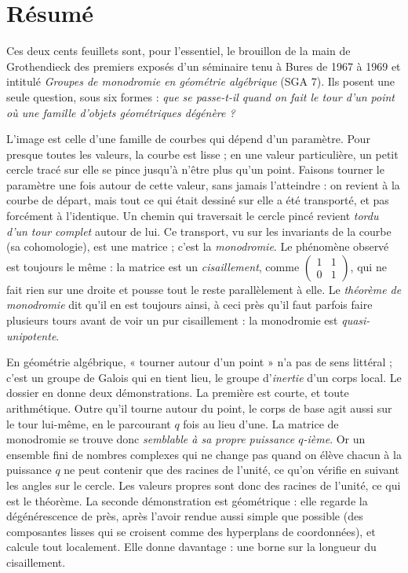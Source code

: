 \documentclass[11pt,a4paper]{article}
\begin{document}
\section*{Résumé}

\begin{resume}
Ces deux cents feuillets sont, pour l'essentiel, le brouillon de la main de
Grothendieck des
premiers exposés d'un séminaire tenu à Bures de 1967 à 1969 et intitulé
\emph{Groupes de monodromie en géométrie algébrique} (SGA 7). Ils posent une
seule question, sous six formes : \emph{que se passe-t-il quand on fait le tour
d'un point où une famille d'objets géométriques dégénère ?}

L'image est celle d'une famille de courbes qui dépend d'un paramètre. Pour
presque toutes les valeurs, la courbe est lisse ; en une valeur particulière,
un petit cercle tracé sur elle se pince jusqu'à n'être plus qu'un point. Faisons
tourner le paramètre une fois autour de cette valeur, sans jamais l'atteindre :
on revient à la courbe de départ, mais tout ce qui était dessiné sur elle a été
transporté, et pas forcément à l'identique. Un chemin qui traversait le cercle
pincé revient \emph{tordu d'un tour complet} autour de lui. Ce transport, vu sur
les invariants de la courbe (sa cohomologie), est une matrice ; c'est la
\emph{monodromie}. Le phénomène observé est toujours le même : la matrice est
un \emph{cisaillement}, comme
$\left(\begin{smallmatrix} 1 & 1 \\ 0 & 1 \end{smallmatrix}\right)$, qui ne fait
rien sur une droite et pousse tout le reste parallèlement à elle. Le
\emph{théorème de monodromie} dit qu'il en est toujours ainsi, à ceci près qu'il
faut parfois faire plusieurs tours avant de voir un pur cisaillement : la
monodromie est \emph{quasi-unipotente}.

En géométrie algébrique, « tourner autour d'un point » n'a pas de sens
littéral ; c'est un groupe de Galois qui en tient lieu, le groupe d'\emph{inertie}
d'un corps local. Le dossier en donne deux démonstrations. La première est
courte, et toute arithmétique. Outre qu'il tourne autour du point, le corps de
base agit aussi sur le tour lui-même,
en le parcourant $q$ fois au lieu d'une. La matrice de monodromie se trouve donc
\emph{semblable à sa propre puissance $q$-ième}. Or un ensemble fini de nombres
complexes qui ne change pas quand on élève chacun à la puissance $q$ ne peut
contenir que des racines de l'unité, ce qu'on vérifie en suivant les angles sur
le cercle. Les valeurs propres sont donc des racines de l'unité, ce qui est
le théorème. La seconde démonstration est géométrique : elle regarde la
dégénérescence de près, après l'avoir rendue aussi simple que possible (des
composantes lisses qui se croisent comme des hyperplans de coordonnées), et
calcule tout localement. Elle donne davantage : une borne sur la longueur du
cisaillement.


\end{resume}
\end{document}
